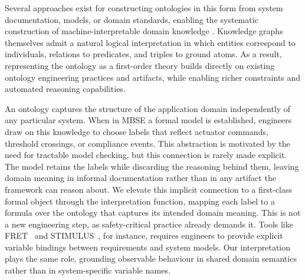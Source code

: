 
Several approaches exist for constructing ontologies in this form from system documentation, models, or domain standards, enabling the systematic construction of machine-interpretable domain knowledge \cite{noy2001ontology, stevens2000ontology,hogan2021knowledge}. Knowledge graphs themselves admit a natural logical interpretation in which entities correspond to individuals, relations to predicates, and triples to ground atoms. As a result, representing the ontology as a first-order theory builds directly on existing ontology engineering practices and artifacts, while enabling richer constraints and automated reasoning capabilities. 


An ontology captures the structure of the application domain independently of any particular system. When in MBSE a formal model is established, engineers draw on this knowledge to choose labels that reflect actuator commands, threshold crossings, or compliance events. This abstraction is motivated by the need for tractable model checking, but this connection is rarely made explicit. The model retains the labels while discarding the reasoning behind them, leaving domain meaning in informal documentation rather than in any artifact the framework can reason about. We elevate this implicit connection to a first-class formal object through the interpretation function, mapping each label to a formula over the ontology that captures its intended domain meaning. This is not a new engineering step, as safety-critical practice already demands it. Tools like FRET~\cite{Giannakopoulou2021} and STIMULUS~\cite{catia_stimulus}, for instance, requires engineers to provide explicit variable bindings between requirements and system models. Our interpretation plays the same role, grounding observable behaviour in shared domain semantics rather than in system-specific variable names.




